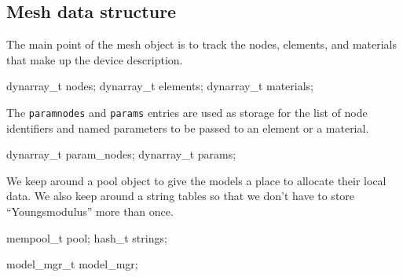 \nwendcode{}\nwdocspar


\subsection{Mesh data structure}

The main point of the mesh object is to track the nodes, elements,
and materials that make up the device description.

\nwenddocs{}\endmoddef
dynarray_t nodes;
dynarray_t elements;
dynarray_t materials;
\nwendcode{}\nwdocspar

The {\tt{}param{}nodes} and {\tt{}params} entries are used as storage
for the list of node identifiers and named parameters to be passed
to an element or a material.

\nwenddocs{}\plusendmoddef
dynarray_t param_nodes;
dynarray_t params;
\nwendcode{}\nwdocspar

We keep around a pool object to give the models a place to allocate
their local data.  We also keep around a string tables so that we
don't have to store ``Youngsmodulus'' more than once. %

\nwenddocs{}\plusendmoddef
mempool_t pool;
hash_t strings;
\nwendcode{}\nwdocspar

\nwenddocs{}\plusendmoddef
model_mgr_t model_mgr;
\nwendcode{}\nwdocspar

